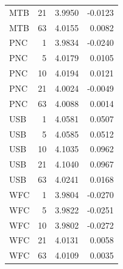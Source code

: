 \begin{table}[ht]
\begin{tabular}{lrrr}
MTB & 21 & 3.9950 & -0.0123 \\
MTB & 63 & 4.0155 & 0.0082 \\
PNC & 1 & 3.9834 & -0.0240 \\
PNC & 5 & 4.0179 & 0.0105 \\
PNC & 10 & 4.0194 & 0.0121 \\
PNC & 21 & 4.0024 & -0.0049 \\
PNC & 63 & 4.0088 & 0.0014 \\
USB & 1 & 4.0581 & 0.0507 \\
USB & 5 & 4.0585 & 0.0512 \\
USB & 10 & 4.1035 & 0.0962 \\
USB & 21 & 4.1040 & 0.0967 \\
USB & 63 & 4.0241 & 0.0168 \\
WFC & 1 & 3.9804 & -0.0270 \\
WFC & 5 & 3.9822 & -0.0251 \\
WFC & 10 & 3.9802 & -0.0272 \\
WFC & 21 & 4.0131 & 0.0058 \\
WFC & 63 & 4.0109 & 0.0035 \\
\bottomrule
\end{tabular}
\end{table}